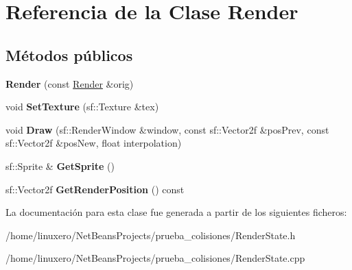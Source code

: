 \hypertarget{classRender}{\section{Referencia de la Clase Render}
\label{classRender}
}
\subsection*{Métodos públicos}
\begin{DoxyCompactItemize}
\item 
\hypertarget{classRender_a23543524bc163c5c214785b969e55876}{{\bfseries Render} (const \hyperlink{classRender}{Render} \&orig)}\label{classRender_a23543524bc163c5c214785b969e55876}

\item 
\hypertarget{classRender_a3562fc0aac5ebc2b404cd51eff4b6af0}{void {\bfseries Set\-Texture} (sf\-::\-Texture \&tex)}\label{classRender_a3562fc0aac5ebc2b404cd51eff4b6af0}

\item 
\hypertarget{classRender_afd55ca41844b8f918605ed7b5f379152}{void {\bfseries Draw} (sf\-::\-Render\-Window \&window, const sf\-::\-Vector2f \&pos\-Prev, const sf\-::\-Vector2f \&pos\-New, float interpolation)}\label{classRender_afd55ca41844b8f918605ed7b5f379152}

\item 
\hypertarget{classRender_a3a14b606f728108e2732460e0e1eaf65}{sf\-::\-Sprite \& {\bfseries Get\-Sprite} ()}\label{classRender_a3a14b606f728108e2732460e0e1eaf65}

\item 
\hypertarget{classRender_a8dfe564d33510e6b84dccd3cc66e66e9}{sf\-::\-Vector2f {\bfseries Get\-Render\-Position} () const }\label{classRender_a8dfe564d33510e6b84dccd3cc66e66e9}

\end{DoxyCompactItemize}


La documentación para esta clase fue generada a partir de los siguientes ficheros\-:\begin{DoxyCompactItemize}
\item 
/home/linuxero/\-Net\-Beans\-Projects/prueba\-\_\-colisiones/Render\-State.\-h\item 
/home/linuxero/\-Net\-Beans\-Projects/prueba\-\_\-colisiones/Render\-State.\-cpp\end{DoxyCompactItemize}
